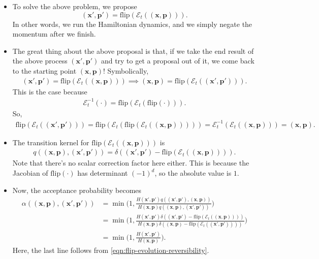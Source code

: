 \documentclass[10pt]{article}
\newcommand{\ve}[1]{\mathbf{#1}}
\newcommand{\mrm}[1]{\mathrm{#1}}
\newcommand{\mcal}[1]{\mathcal{#1}}
\begin{document}
\begin{itemize}
  \item To solve the above problem, we propose $$(\ve{x}',\ve{p}') = \mrm{flip}(\mcal{E}_t((\ve{x},\ve{p}))).$$ In other words, we run the Hamiltonian dynamics, and we simply negate the momentum after we finish.
  
  \item The great thing about the above proposal is that, if we take the end result of the above process $(\ve{x}',\ve{p}')$ and try to get a proposal out of it, we come back to the starting point $(\ve{x},\ve{p})$! Symbolically,
  \begin{align} \label{eqn:flip-evolution-reversibility}
    (\ve{x}',\ve{p}') = \mrm{flip}(\mcal{E}_t((\ve{x},\ve{p}))) \implies (\ve{x},\ve{p}) = \mrm{flip}(\mcal{E}_t((\ve{x}',\ve{p}'))).
  \end{align}
  This is the case because
  \begin{align*}
    \mcal{E}_t^{-1}(\cdot) = \mrm{flip}(\mcal{E}_t(\mrm{flip}(\cdot))).
  \end{align*}
  So,
  \begin{align*}
    \mrm{flip}(\mcal{E}_t((\ve{x}',\ve{p}')))
    = \mrm{flip}(\mcal{E}_t(\mrm{flip}(\mcal{E}_t((\ve{x},\ve{p})))))
    = \mcal{E}_t^{-1}(\mcal{E}_t((\ve{x},\ve{p}))) 
    = (\ve{x},\ve{p}).
  \end{align*}

  \item The transition kernel for $\mrm{flip}(\mcal{E}_t((\ve{x},\ve{p})))$ is
  \begin{align*}
    q((\ve{x},\ve{p}),(\ve{x}',\ve{p}')) = \delta((\ve{x}',\ve{p}') - \mrm{flip}(\mcal{E}_t((\ve{x},\ve{p})))).
  \end{align*}
  Note that there's no scalar correction factor here either. This is because the Jacobian of $\mrm{flip}(\cdot)$ has determinant $(-1)^d$, so the absolute value is $1$.

  \item Now, the acceptance probability becomes
  \begin{align*}
    \alpha((\ve{x},\ve{p}), (\ve{x}',\ve{p}')) 
    &= \min\bigg(1, \frac{H(\ve{x}',\ve{p}') q((\ve{x'},\ve{p}'),(\ve{x},\ve{p}))}{H(\ve{x},\ve{p})q((\ve{x},\ve{p}),(\ve{x}',\ve{p}'))} \bigg) \\
    &= \min\bigg( 1, \frac{H(\ve{x}',\ve{p}') \delta((\ve{x}',\ve{p}') - \mrm{flip}(\mcal{E}_t((\ve{x},\ve{p})))) }{H(\ve{x},\ve{p}) \delta((\ve{x},\ve{p}) - \mrm{flip}(\mcal{E}_t((\ve{x}',\ve{p}')))) } \bigg)\\
    &= \min\bigg( 1, \frac{H(\ve{x}',\ve{p}')}{H(\ve{x},\ve{p})} \bigg).
  \end{align*}
  Here, the last line follows from \eqref{eqn:flip-evolution-reversibility}.


\end{itemize}
\end{document}
